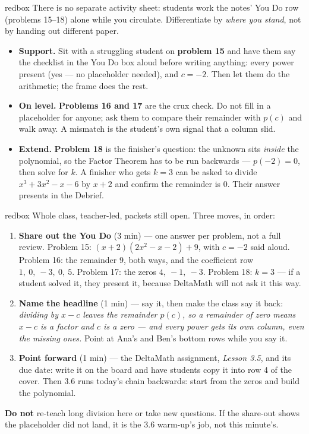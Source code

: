 \documentclass[10pt]{article}
\begin{document}
\begin{skillbox}{redbox}
There is no separate activity sheet: students work the notes' You Do row (problems 15--18)
alone while you circulate. Differentiate by \textit{where you stand}, not by handing out
different paper.

\begin{itemize}
  \item \textbf{Support.} Sit with a struggling student on \textbf{problem 15} and have them
        say the checklist in the You Do box aloud before writing anything: every power present
        (yes --- no placeholder needed), and $c = -2$. Then let them do the arithmetic; the
        frame does the rest.
  \item \textbf{On level.} \textbf{Problems 16 and 17} are the crux check. Do not fill in a
        placeholder for anyone; ask them to compare their remainder with $p(c)$ and walk away.
        A mismatch is the student's own signal that a column slid.
  \item \textbf{Extend.} \textbf{Problem 18} is the finisher's question: the unknown sits
        \emph{inside} the polynomial, so the Factor Theorem has to be run backwards ---
        $p(-2) = 0$, then solve for $k$. A finisher who gets $k = 3$ can be asked to divide
        $x^3 + 3x^2 - x - 6$ by $x + 2$ and confirm the remainder is $0$. Their answer
        presents in the Debrief.
\end{itemize}
\end{skillbox}

\boxguard[20]
\begin{skillbox}{redbox}
Whole class, teacher-led, packets still open. Three moves, in order:
\begin{enumerate}[itemsep=3pt]
  \item \textbf{Share out the You Do} (3 min) --- one answer per problem, not a full review.
        Problem 15: $(x + 2)(2x^2 - x - 2) + 9$, with $c = -2$ said aloud. Problem 16: the
        remainder $9$, both ways, and the coefficient row $1,\ 0,\ -3,\ 0,\ 5$. Problem 17: the
        zeros $4,\ -1,\ -3$. Problem 18: $k = 3$ --- if a student solved it, they present it,
        because DeltaMath will not ask it this way.
  \item \textbf{Name the headline} (1 min) --- say it, then make the class say it back:
        \textit{dividing by $x - c$ leaves the remainder $p(c)$, so a remainder of zero means
        $x - c$ is a factor and $c$ is a zero --- and every power gets its own column, even the
        missing ones.} Point at Ana's and Ben's bottom rows while you say it.
  \item \textbf{Point forward} (1 min) --- the DeltaMath assignment, \textit{Lesson 3.5}, and
        its due date: write it on the board and have students copy it into row 4 of the cover.
        Then 3.6 runs today's chain backwards: start from the zeros and build the polynomial.
\end{enumerate}
\textbf{Do not} re-teach long division here or take new questions. If the share-out shows the
placeholder did not land, it is the 3.6 warm-up's job, not this minute's.
\end{skillbox}
\end{document}
